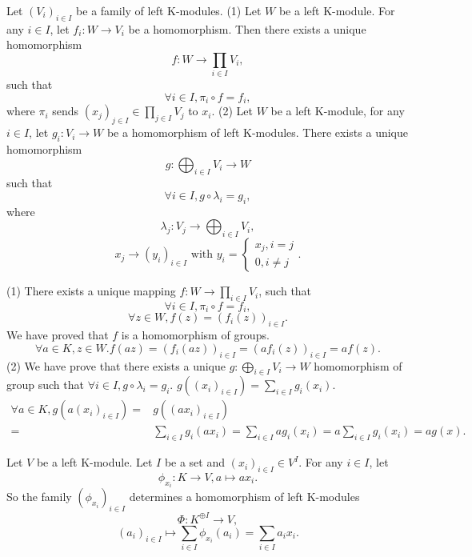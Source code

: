 \begin{propositionenv}
    Let $(V_i)_{i\in I}$ be a family of left K-modules.
    \newline
    (1) Let $W$ be a left K-module. For any $i\in I$,  let $f_i:W\rightarrow V_i$ be a homomorphism. Then there exists a unique homomorphism 
    $$f:W\longrightarrow \prod_{i\in I}V_i, $$ 
    such that 
    $$\forall i\in I, \pi_i\circ f=f_i, $$
    where $\pi_i$ sends $(x_j)_{j\in I}\in \prod_{j\in I}V_j$ to $x_i$.
    \newline
    (2) Let $W$ be a left K-module,  for any $i\in I$,  let $g_i:V_i\rightarrow W$ be a homomorphism of left K-modules. There exists a unique homomorphism
    $$g:\bigoplus_{i\in I}V_i\longrightarrow W$$
    such that 
    $$\forall i\in I,  g\circ\lambda_i=g_i, $$
    where
    $$\lambda_j:V_j\longrightarrow\bigoplus_{i\in I}V_i, $$
    $$x_j\longrightarrow (y_i)_{i\in I} \text{ with } y_i=\left\{\begin{matrix}
        x_j, i=j\\0, i\not=j
    \end{matrix}\right. .$$
\end{propositionenv}
\begin{proofenv}
    \quad
    \newline
    (1) There exists a unique mapping $f:W\rightarrow \prod_{i\in I}V_i$,  such that 
    $$\forall i\in I, \pi_i\circ f=f_i, $$
    $$\forall z\in W, f(z)=(f_i(z))_{i\in I}.$$
    We have proved that $f$ is a homomorphism of groups.
    $$\forall a\in K, z\in W. f(az)=(f_i(az))_{i\in I}=(af_i(z))_{i\in I}=af(z).$$
    (2) We have prove that there exists a unique $g:\bigoplus_{i\in I}V_i\rightarrow W$ homomorphism of group such that $\forall i\in I,  g\circ \lambda_i=g_i.$ $g\left((x_i)_{i\in I}\right)=\sum_{i\in I}g_i(x_i)$.
    \begin{align*}
        \forall a\in K, g\left(a(x_i)_{i\in I}\right)=&g\left((ax_i)_{i\in I}\right)\\
        =&\sum_{i\in I}g_i(ax_i)=\sum_{i\in I}ag_i(x_i)
        =a\sum_{i\in I}g_i(x_i)=ag(x).
    \end{align*}
\end{proofenv}
\begin{applicationenv}
Let $V$ be a left K-module. Let $I$ be a set and $(x_i)_{i\in I}\in V^{I}$. For any $i\in I$,  let 
$$\phi_{x_i}:K\longrightarrow V, a\mapsto ax_i.$$ 
So the family $(\phi_{x_i})_{i\in I}$ determines a homomorphism of left K-modules 
$$\Phi:K^{\oplus I}\longrightarrow V, $$
$$(a_i)_{i\in I}\longmapsto \sum_{i\in I}\phi_{x_i}(a_i)=\sum_{i\in I}a_ix_i.$$
\end{applicationenv}

